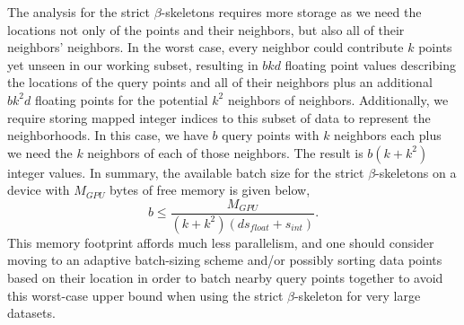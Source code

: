 The analysis for the strict $\beta$-skeletons requires more storage as we need the locations not only of the points and their neighbors, but also all of their neighbors' neighbors.
%
In the worst case, every neighbor could contribute $k$ points yet unseen in our working subset, resulting in $bkd$ floating point values describing the locations of the query points and all of their neighbors plus an additional $bk^2d$ floating points for the potential $k^2$ neighbors of neighbors.
%
Additionally, we require storing mapped integer indices to this subset of data to represent the neighborhoods.
%
In this case, we have $b$ query points with $k$ neighbors each plus we need the $k$ neighbors of each of those neighbors.
%
The result is $b(k + k^2)$ integer values.
%
In summary, the available batch size for the strict $\beta$-skeletons on a device with $M_{GPU}$ bytes of free memory is given below,
%
\begin{equation}
    b \leq \frac{M_{GPU}}{(k+k^2)\left(ds_{float} + s_{int}\right)}.
\end{equation}
%
This memory footprint affords much less parallelism, and one should consider moving to an adaptive batch-sizing scheme and/or possibly sorting data points based on their location in order to batch nearby query points together to avoid this worst-case upper bound when using the strict $\beta$-skeleton for very large datasets.
%


